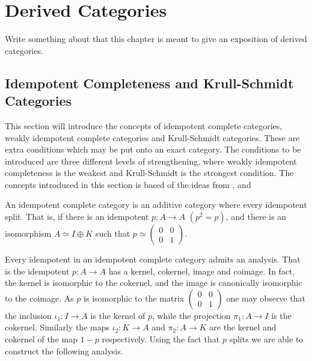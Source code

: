 \chapter{Derived Categories}

Write something about that this chapter is meant to give an exposition of derived categories. 

\section{Idempotent Completeness and Krull-Schmidt Categories}

    This section will introduce the concepts of idempotent complete categories, weakly idempotent complete categories and Krull-Schmidt categories. These are extra conditions which may be put onto an exact category. The conditions to be introduced are three different levels of strengthening, where weakly idempotent completeness is the weakest and Krull-Schmidt is the strongest condition. The concepts introduced in this section is based of the ideas from \cite{buhler}, \cite{Kra12} and \cite{Rei95}

    \begin{definition}
        An idempotent complete category is an additive category where every idempotent split. That is, if there is an idempotent $p:A\rightarrow A$ $(p^2=p)$, and there is an isomorphism $A\simeq I\oplus K$ such that $p\simeq \begin{pmatrix} 0 & 0 \\ 0 & 1 \end{pmatrix}$. 
    \end{definition}

    Every idempotent in an idempotent complete category admits an analysis. That is the idempotent $p:A\rightarrow A$ has a kernel, cokernel, image and coimage. In fact, the kernel is isomorphic to the cokernel, and the image is canonically isomorphic to the coimage. As $p$ is isomorphic to the matrix $\begin{pmatrix} 0 & 0 \\ 0 & 1 \end{pmatrix}$ one may observe that the inclusion $\iota_1:I\rightarrow A$ is the kernel of $p$, while the projection $\pi_1:A\rightarrow I$ is the cokernel. Similarly the maps $\iota_2:K\rightarrow A$ and $\pi_2:A\rightarrow K$ are the kernel and cokernel of the map $1-p$ respectively. Using the fact that $p$ splits we are able to construct the following analysis.

    \begin{center}
    \end{center}


